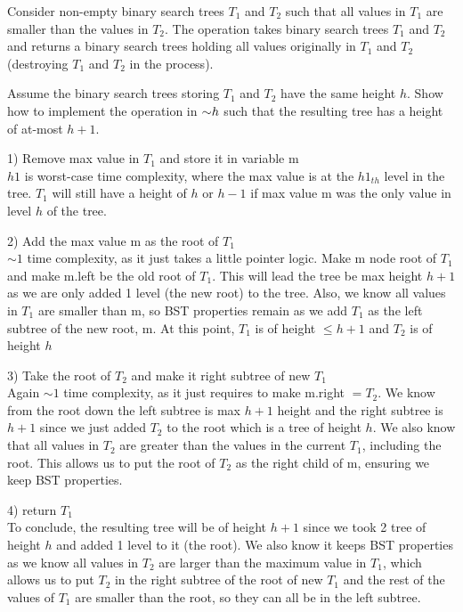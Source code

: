 \begin{problem}
Consider non-empty binary search trees $T_1$ and $T_2$ such that all values in $T_1$ are smaller than the values in $T_2$. The  operation takes binary search trees $T_1$ and $T_2$ and returns a binary search trees holding all values originally in $T_1$ and $T_2$ (destroying $T_1$ and $T_2$ in the process). 
\begin{questions}
\item Assume the binary search trees storing $T_1$ and $T_2$ have the same height $h$. Show how to implement the  operation in $\mathord{\sim}h$ such that the resulting tree has a height of at-most $h+1$.

1) Remove max value in $T_1$ and store it in variable m\\
$h1$ is worst-case time complexity, where the max value is at the $h1_{th}$ level in the tree. $T_1$ will still have a height of $h$ or $h-1$ if max value m was the only value in level $h$ of the tree.

2) Add the max value m as the root of $T_1$\\
$\sim 1$ time complexity, as it just takes a little pointer logic. Make m node root of $T_1$ and make m.left be the old root of $T_1$. This will lead the tree be max height $h+1$ as we are only added 1 level (the new root) to the tree.
Also, we know all values in $T_1$ are smaller than m, so BST properties remain as we add $T_1$ as the left subtree of the new root, m.
At this point, $T_1$ is of height $ \leq h+1$ and $T_2$ is of height $h$

3) Take the root of $T_2$ and make it right subtree of new $T_1$\\
Again $\sim 1$ time complexity, as it just requires to make m.right $ = T_2$. We know from the root down the left subtree is max $h+1$ height and the right subtree is $h+1$ since we just added $T_2$ to the root which is a tree of height $h$.
We also know that all values in $T_2$ are greater than the values in the current $T_1$, including the root. This allows us to put the root of $T_2$ as the right child of m, ensuring we keep BST properties.

4) return $T_1$\\

To conclude, the resulting tree will be of height $h+1$ since we took 2 tree of height $h$ and added 1 level to it (the root). We also know it keeps BST properties as we know all values in $T_2$ are larger than the maximum value in $T_1$, which allows us to put $T_2$ in the right subtree of the root of new $T_1$ and the rest of the values of $T_1$ are smaller than the root, so they can all be in the left subtree.


\end{questions}
\end{problem}
